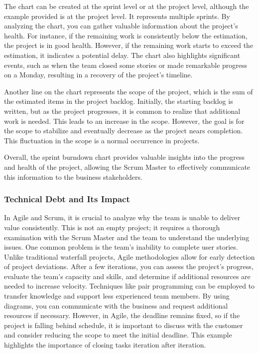 The chart can be created at the sprint level or at the project level,
although the example provided is at the project level. It represents
multiple sprints. By analyzing the chart, you can gather valuable
information about the project's health. For instance, if the remaining
work is consistently below the estimation, the project is in good
health. However, if the remaining work starts to exceed the estimation,
it indicates a potential delay. The chart also highlights significant
events, such as when the team closed some stories or made remarkable
progress on a Monday, resulting in a recovery of the project's timeline.

Another line on the chart represents the scope of the project, which is
the sum of the estimated items in the project backlog. Initially, the
starting backlog is written, but as the project progresses, it is common
to realize that additional work is needed. This leads to an increase in
the scope. However, the goal is for the scope to stabilize and
eventually decrease as the project nears completion. This fluctuation in
the scope is a normal occurrence in projects.

Overall, the sprint burndown chart provides valuable insights into the
progress and health of the project, allowing the Scrum Master to
effectively communicate this information to the business stakeholders.

\subsubsection{Technical Debt and Its Impact}

In Agile and Scrum, it is crucial to analyze why the team is unable to
deliver value consistently. This is not an empty project; it requires a
thorough examination with the Scrum Master and the team to understand
the underlying issues. One common problem is the team's inability to
complete user stories. Unlike traditional waterfall projects, Agile
methodologies allow for early detection of project deviations. After a
few iterations, you can assess the project's progress, evaluate the
team's capacity and skills, and determine if additional resources are
needed to increase velocity. Techniques like pair programming can be
employed to transfer knowledge and support less experienced team
members. By using diagrams, you can communicate with the business and
request additional resources if necessary. However, in Agile, the
deadline remains fixed, so if the project is falling behind schedule, it
is important to discuss with the customer and consider reducing the
scope to meet the initial deadline. This example highlights the
importance of closing tasks iteration after iteration.

